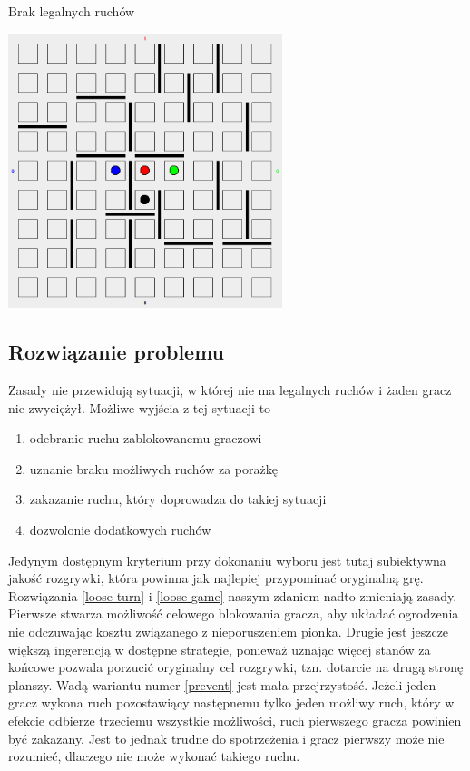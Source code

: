 \documentclass{pracamgr}
\begin{document}
\begin{rysunek}
\caption{Brak legalnych ruchów \label{problem}}
\centering
\includegraphics[width=80mm]{no-move.png}
\end{rysunek}

\subsection{Rozwiązanie problemu}

Zasady nie przewidują sytuacji, w której nie ma legalnych ruchów i żaden gracz nie zwyciężył.
Możliwe wyjścia z tej sytuacji to

\begin{enumerate}
\item \label{loose-turn} odebranie ruchu zablokowanemu graczowi
\item \label{loose-game} uznanie braku możliwych ruchów za porażkę
\item \label{prevent} zakazanie ruchu, który doprowadza do takiej sytuacji
\item \label{solve} dozwolonie dodatkowych ruchów
\end {enumerate}

Jedynym dostępnym kryterium przy dokonaniu wyboru jest tutaj subiektywna jakość rozgrywki, która powinna jak najlepiej przypominać oryginalną grę.
Rozwiązania \ref{loose-turn} i \ref{loose-game} naszym zdaniem nadto zmieniają zasady.
Pierwsze stwarza możliwość celowego blokowania gracza, aby układać ogrodzenia nie odczuwając kosztu związanego z nieporuszeniem pionka.
Drugie jest jeszcze większą ingerencją w dostępne strategie, ponieważ uznając więcej stanów za końcowe pozwala porzucić oryginalny cel rozgrywki, tzn. dotarcie na drugą stronę planszy.
Wadą wariantu numer \ref{prevent} jest mała przejrzystość.
Jeżeli jeden gracz wykona ruch pozostawiący następnemu tylko jeden możliwy ruch, który w efekcie odbierze trzeciemu wszystkie możliwości, ruch pierwszego gracza powinien być zakazany.
Jest to jednak trudne do spotrzeżenia i gracz pierwszy może nie rozumieć, dlaczego nie może wykonać takiego ruchu.
\end{document}
